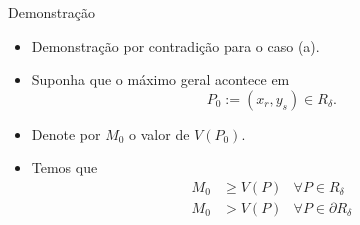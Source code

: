\documentclass{beamer}
\newcommand{\dR}{\partial R}
\begin{document}
\begin{frame}{Demonstração}
\begin{itemize}[<+->]
    \item Demonstração por contradição para o caso (a).
    \item Suponha que o máximo geral acontece em \[P_0 := (x_r,y_s) \in R_\delta.\]
    \item Denote por $M_0$ o valor de $V(P_0)$.
    \item Temos que 
    \begin{align*}
        M_0 &\ge V(P) & \forall P\in R_\delta \\
        M_0 &> V(P) &  \forall P\in\dR_\delta \label{HP}\tag{H.P}
    \end{align*} 
\end{itemize}
    
\end{frame}
\end{document}
